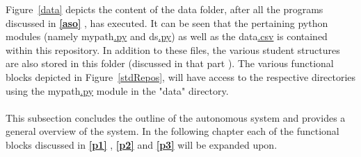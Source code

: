 Figure~\ref{data} depicts the content of the data folder, after all the programs discussed in \textbf{\ref{aso} }, has executed. It can be seen that the pertaining python modules (namely mypath\hyperref[listExt]{.py} and ds\hyperref[listExt]{.py}) as well as the data\hyperref[listExt]{.csv} is contained within this repository. In addition to these files, the various student structures are also stored in this folder (discussed in \color{green} that part \color{black}). The various functional blocks depicted in Figure~\ref{stdRepos}, will have access to the respective directories using the mypath\hyperref[listExt]{.py} module in the "data" directory.
\\\\
This subsection concludes the outline of the autonomous system and provides a general overview of the system. In the following chapter each of the functional blocks discussed in \textbf{\ref{p1} }, \textbf{\ref{p2} } and \textbf{\ref{p3} } will be expanded upon.
